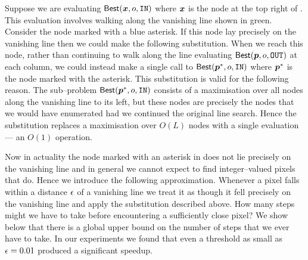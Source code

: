 Suppose we are evaluating $\SubProb(\vect{x},\WallOrient,\INlabel)$
where $\vect{x}$ is the node at the top right of
. This evaluation involves walking along
the vanishing line shown in green. Consider the node marked with a
blue asterisk. If this node lay precisely on the vanishing line then
we could make the following substitution. When we reach this node,
rather than continuing to walk along the line evaluating
$\SubProb(\Pixel,\WallOrient,\OUTlabel)$ at each column, we could
instead make a single call to
$\SubProb(\Pixel^*,\WallOrient,\INlabel)$ where $\Pixel^*$ is the node
marked with the asterisk. This substitution is valid for the following
reason. The sub--problem $\SubProb(\Pixel^*,\WallOrient,\INlabel)$
consists of a maximisation over all nodes along the vanishing line to
its left, but these nodes are precisely the nodes that we would have
enumerated had we continued the original line search. Hence the
substitution replaces a maximisation over $O(L)$ nodes with a single
evaluation --- an $O(1)$ operation.

Now in actuality the node marked with an asterisk in
 does not lie precisely on the vanishing
line and in general we cannot expect to find integer--valued pixels
that do. Hence we introduce the following approximation. Whenever a
pixel falls within a distance $\RoundoffEps$ of a vanishing line we
treat it as though it fell precisely on the vanishing line and apply
the substitution described above. How many steps might we have to take
before encountering a sufficiently close pixel? We show below that
there is a global upper bound on the number of steps that we ever have
to take. In our experiments we found that even a threshold as small as
$\RoundoffEps=0.01$ produced a significant speedup.

